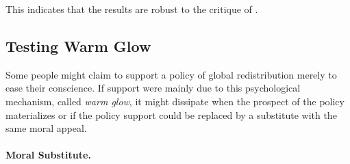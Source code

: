 \documentclass[12pt,english]{article}
\begin{document}
\begin{bibunit}
This indicates that the results are robust to the critique of \cite{de_la_cuesta_improving_2022}. 

\subsection{Testing Warm Glow}\label{subsec:warm_glow}

Some people might claim to support a policy of global redistribution merely to ease their conscience. If support were mainly due to this psychological mechanism, called \textit{warm glow}, it might
dissipate when the prospect of the policy materializes or if the policy support could be replaced by a substitute with the same moral appeal.

\paragraph{Moral Substitute.}


\end{bibunit}
\end{document}
